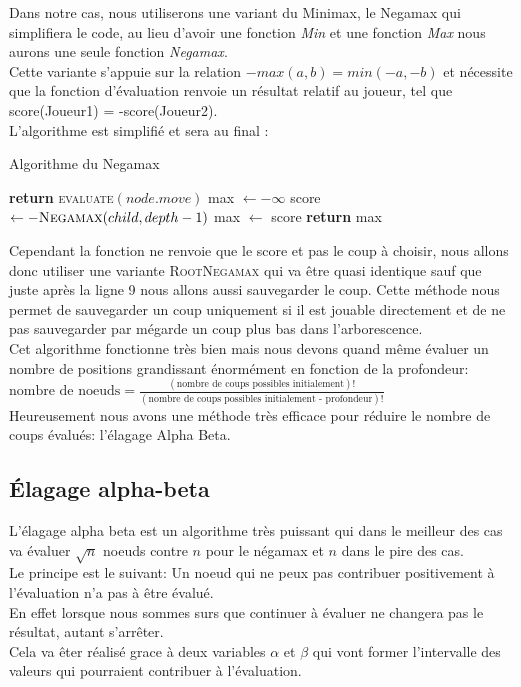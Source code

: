\documentclass{article}
\begin{document}
Dans notre cas, nous utiliserons une variant du Minimax, le Negamax qui simplifiera le code, au lieu d'avoir une fonction \textit{Min}
et une fonction \textit{Max} nous aurons une seule fonction \textit{Negamax}.\\
Cette variante s'appuie sur la relation $-max(a,b) = min(-a,-b)$ et nécessite que la fonction d'évaluation renvoie un résultat
relatif au joueur, tel que score(Joueur1) = -score(Joueur2).\\
L'algorithme est simplifié et sera au final :
\begin{algorithm}
\caption{Algorithme du Negamax}\label{negamax}
\begin{algorithmic}[1]
		\State \textbf{return} \textsc{evaluate}$(node.move)$
	\EndIf
	\State max $\gets -\infty$
		\State score $\gets -\textsc{Negamax}(child, depth -1)$
			\State max $\gets$ score
		\EndIf
	\EndFor
	\State \textbf{return} max
\EndProcedure
\end{algorithmic}
\end{algorithm}

Cependant la fonction ne renvoie que le score et pas le coup à choisir, nous allons donc utiliser une variante \textsc{RootNegamax} 
qui va être quasi identique sauf que juste après la ligne 9 nous allons aussi sauvegarder le coup. Cette méthode nous permet
de sauvegarder un coup uniquement si il est jouable directement et de ne pas sauvegarder par mégarde un coup plus bas dans
l'arborescence.\\

Cet algorithme fonctionne très bien mais nous devons quand même évaluer un nombre de positions grandissant énormément en fonction
de la profondeur:\\
$\text{nombre de noeuds} = \frac{(\text{nombre de coups possibles initialement})!}{(\text{nombre de coups possibles initialement - profondeur})!}$\\
Heureusement nous avons une méthode très efficace pour réduire le nombre de coups évalués: l'élagage Alpha Beta.

\pagebreak
\subsection{Élagage alpha-beta}

L'élagage alpha beta est un algorithme très puissant qui dans le meilleur des cas va évaluer $\sqrt{n}$ noeuds contre $n$ pour le négamax et $n$ dans
le pire des cas.\\
Le principe est le suivant: Un noeud qui ne peux pas contribuer positivement à l'évaluation n'a pas à être évalué.\\
En effet lorsque nous sommes surs que continuer à évaluer ne changera pas le résultat, autant s'arrêter.\\
Cela va êter réalisé grace à deux variables $\alpha$ et $\beta$ qui vont former l'intervalle des valeurs qui pourraient contribuer à l'évaluation.
\end{document}
